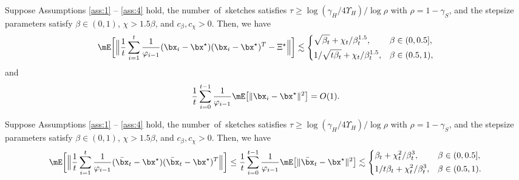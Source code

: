 \begin{lemma}\label{appen:A5:lem1}

Suppose Assumptions \ref{ass:1} -- \ref{ass:4} hold, the \mbox{number}~of~sketches satisfies $\tau\geq \log(\gamma_H/4\Upsilon_H)/\log \rho$ with $\rho = 1-\gamma_S$, and the stepsize parameters satisfy $\beta\in(0,1)$, $\chi>1.5\beta$, and $c_{\beta}, c_{\chi}>0$. Then, we have
\begin{equation}\label{appen:A5:equ10}
\mE\bigg[\Big\|\frac{1}{t}\sum_{i=1}^t\frac{1}{\varphi_{i-1}}(\bx_i-\bx^\star)(\bx_i-\bx^\star)^T-\Xi^\star\Big\|\bigg] \lesssim \begin{dcases}
\sqrt{\beta_t} + \chi_t/\beta_t^{1.5}, &\beta\in(0,0.5],\\
1/\sqrt{t\beta_t} + \chi_t/\beta_t^{1.5}, &\beta\in(0.5,1),
\end{dcases}
\end{equation}
and
\begin{equation}\label{appen:A5:equ19}
\frac{1}{t}\sum_{i=0}^{t-1}\frac{1}{\varphi_{i-1}}\mE\big[\|\bx_i-\bx^\star\|^2\big] = O(1).
\end{equation}
\end{lemma}

\begin{lemma}\label{appen:A5:lem2}

Suppose Assumptions \ref{ass:1} -- \ref{ass:4} hold, the \mbox{number}~of~sketches satisfies $\tau\geq \log(\gamma_H/4\Upsilon_H)/\log \rho$ with $\rho = 1-\gamma_S$, and the stepsize parameters satisfy $\beta\in(0,1)$, $\chi>1.5\beta$, and $c_{\beta}, c_{\chi}>0$. Then, we have
\begin{equation*}
\mE\bigg[\Big\|\frac{1}{t}\sum_{i=1}^t\frac{1}{\varphi_{i-1}}(\bar{\bx}_t-\bx^\star)(\bar{\bx}_t-\bx^\star)^T\Big\|\bigg]\leq\frac{1}{t}\sum_{i=0}^{t-1}\frac{1}{\varphi_{i-1}}\mE\big[\|\bar{\bx}_t-\bx^\star\|^2\big]
\lesssim \begin{dcases}
\beta_t + \chi_t^2/\beta_t^3, &\beta\in(0,0.5],\\
1/t\beta_t + \chi_t^2/\beta_t^3, &\beta\in(0.5,1).
\end{dcases}
\end{equation*}
\end{lemma}


